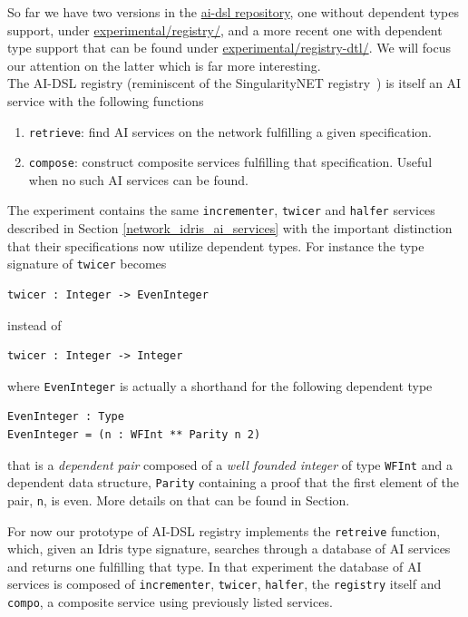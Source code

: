 \documentclass[]{report}
\newcommand{\nil}[2][]{\todo[color=purple,author=nil, #1]{#2}}
\begin{document}
So far we have two versions in the
\href{https://github.com/singnet/ai-dsl/}{ai-dsl repository}, one
without dependent types support, under
\href{https://github.com/singnet/ai-dsl/blob/master/experimental/realized-function/}{experimental/registry/},
and a more recent one with dependent type support that can be found
under
\href{https://github.com/singnet/ai-dsl/blob/master/experimental/registry-dtl/}{experimental/registry-dtl/}.
We will focus our attention on the latter which is far more
interesting.\\

The AI-DSL registry (reminiscent of the SingularityNET
registry~\cite{TODO}) is itself an AI service with the following functions
\begin{enumerate}
\item \texttt{retrieve}: find AI services on the network fulfilling a
  given specification.
\item \texttt{compose}: construct composite services fulfilling that
  specification.  Useful when no such AI services can be found.
\end{enumerate}

The experiment contains the same \texttt{incrementer}, \texttt{twicer}
and \texttt{halfer} services described in Section
\ref{network_idris_ai_services} with the important distinction that
their specifications now utilize dependent types.  For instance the
type signature of \texttt{twicer} becomes
\begin{verbatim}
twicer : Integer -> EvenInteger
\end{verbatim}
instead of
\begin{verbatim}
twicer : Integer -> Integer
\end{verbatim}
where \texttt{EvenInteger} is actually a shorthand for the following
dependent type
\begin{verbatim}
EvenInteger : Type
EvenInteger = (n : WFInt ** Parity n 2)
\end{verbatim}
that is a \emph{dependent pair} composed of a \emph{well founded
integer} of type \texttt{WFInt} and a dependent data structure,
\texttt{Parity} containing a proof that the first element of the pair,
\texttt{n}, is even.  More details on that can be found in
Section\nil{Add ref to Sam's work}.

For now our prototype of AI-DSL registry implements the
\texttt{retreive} function, which, given an Idris type signature,
searches through a database of AI services and returns one fulfilling
that type.  In that experiment the database of AI services is composed
of \texttt{incrementer}, \texttt{twicer}, \texttt{halfer}, the
\texttt{registry} itself and \texttt{compo}, a composite service using
previously listed services.
\end{document}
